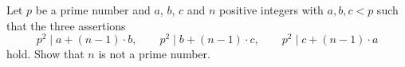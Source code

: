 Let $p$ be a prime number and $a$, $b$, $c$ and $n$ positive integers with $a, b, c<p$ such that
the three assertions
$$p^2 \mid a + (n-1)\cdot b, \qquad p^2 \mid b + (n-1)\cdot c, \qquad p^2 \mid c + (n-1)\cdot a$$
hold. Show that $n$ is not a prime number.
